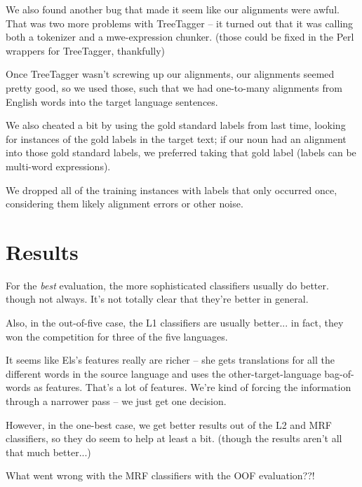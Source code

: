 \documentclass[11pt,letterpaper]{article}
\begin{document}
We also found another bug that made it seem like our alignments were awful.
That was two more problems with TreeTagger -- it turned out that it was calling
both a tokenizer and a mwe-expression chunker. (those could be fixed in the
Perl wrappers for TreeTagger, thankfully)

Once TreeTagger wasn't screwing up our alignments, our alignments seemed pretty
good, so we used those, such that we had one-to-many alignments from English
words into the target language sentences.

We also cheated a bit by using the gold standard labels from last time, looking
for instances of the gold labels in the target text; if our noun had an
alignment into those gold standard labels, we preferred taking that gold label
(labels can be multi-word expressions).

We dropped all of the training instances with labels that only occurred once,
considering them likely alignment errors or other noise.

\section{Results}
For the \emph{best} evaluation, the more sophisticated classifiers usually do
better. though not always. It's not totally clear that they're better in
general.

Also, in the out-of-five case, the L1 classifiers are usually better... in
fact, they won the competition for three of the five languages.

It seems like Els's features really are richer -- she gets translations for all
the different words in the source language and uses the other-target-language
bag-of-words as features. That's a lot of features. We're kind of forcing the
information through a narrower pass -- we just get one decision.

However, in the one-best case, we get better results out of the L2 and MRF
classifiers, so they do seem to help at least a bit. (though the results aren't
all that much better...)

What went wrong with the MRF classifiers with the OOF evaluation??!
\end{document}
